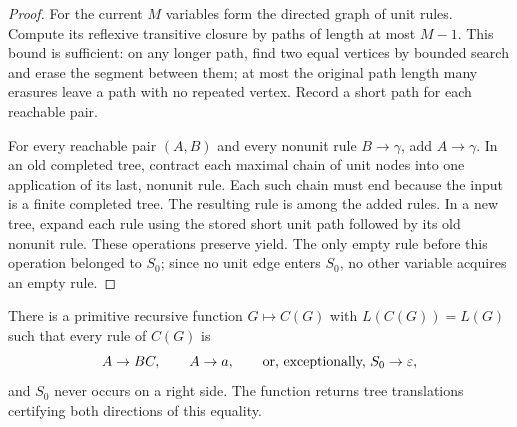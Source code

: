 \begin{proof}
For the current $M$ variables form the directed graph of unit rules.
Compute its reflexive transitive closure by paths of length at most $M-1$.
This bound is sufficient: on any longer path, find two equal vertices by
bounded search and erase the segment between them; at most the original
path length many erasures leave a path with no repeated vertex.  Record a
short path for each reachable pair.

For every reachable pair $(A,B)$ and every nonunit rule $B\to\gamma$, add
$A\to\gamma$.  In an old completed tree, contract each maximal chain of
unit nodes into one application of its last, nonunit rule.  Each such chain
must end because the input is a finite completed tree.  The resulting rule
is among the added rules.  In a new tree, expand each rule using the stored
short unit path followed by its old nonunit rule.  These operations preserve
yield.  The only empty rule before this operation belonged to $S_0$; since
no unit edge enters $S_0$, no other variable acquires an empty rule.
\end{proof}

\begin{theorem}
\label{cf:cnf}
There is a primitive recursive function $G\mapsto C(G)$ with
$L(C(G))=L(G)$ such that every rule of $C(G)$ is
\[
 A\to BC,\qquad A\to a,\qquad\text{or, exceptionally, } S_0\to\varepsilon,
\]
and $S_0$ never occurs on a right side.  The function returns tree
translations certifying both directions of this equality.
\end{theorem}

